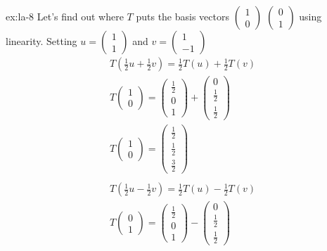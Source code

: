 \begin{solution}{ex:la-8}
  Let's find out where $T$ puts the basis vectors $\begin{pmatrix}1\\0\end{pmatrix}$ $\begin{pmatrix}0\\1\end{pmatrix}$ using linearity. Setting $u=\begin{pmatrix}1\\1\end{pmatrix}$ and $v=\begin{pmatrix}1\\-1\end{pmatrix}$
  \[
    \begin{gathered}
      T(\frac{1}{2}u+\frac{1}{2}v)=\frac{1}{2}T(u)+\frac{1}{2}T(v)\\
      T\begin{pmatrix}1\\0\end{pmatrix}=\begin{pmatrix}\frac{1}{2}\\0\\1\end{pmatrix}+\begin{pmatrix}0\\\frac{1}{2}\\\frac{1}{2}\end{pmatrix}\\
      T\begin{pmatrix}1\\0\end{pmatrix}=\begin{pmatrix}\frac{1}{2}\\\frac{1}{2}\\\frac{3}{2}\end{pmatrix} \\\\
      T(\frac{1}{2}u-\frac{1}{2}v)=\frac{1}{2}T(u)-\frac{1}{2}T(v)\\
      T\begin{pmatrix}0\\1\end{pmatrix}=\begin{pmatrix}\frac{1}{2}\\0\\1\end{pmatrix}-\begin{pmatrix}0\\\frac{1}{2}\\\frac{1}{2}\end{pmatrix}\\

\end{gathered}\]
\end{solution}
